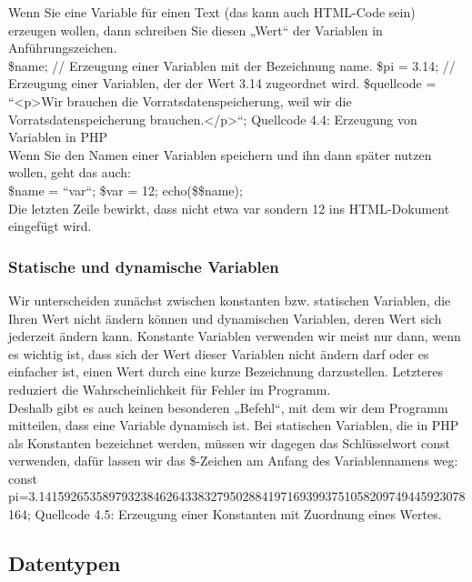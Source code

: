 Wenn Sie eine Variable für einen Text (das kann auch HTML-Code sein) erzeugen wollen, dann schreiben Sie diesen „Wert“ der Variablen in Anführungszeichen.\\

\$name;                         // Erzeugung einer Variablen mit der Bezeichnung name.
\$pi = 3.14;                    // Erzeugung einer Variablen, der der Wert 3.14 zugeordnet wird.
\$quellcode = ``<p>Wir brauchen die Vorratsdatenspeicherung, weil wir die Vorratsdatenspeicherung brauchen.</p>``;
Quellcode 4.4: Erzeugung von Variablen in PHP\\

Wenn Sie den Namen einer Variablen speichern und ihn dann später nutzen wollen, geht das auch:\\

\$name = ``var``;
\$var = 12;
echo(\$\$name); \\


Die letzten Zeile bewirkt, dass nicht etwa var sondern 12 ins HTML-Dokument eingefügt wird.

\subsubsection{Statische und dynamische Variablen}

Wir unterscheiden zunächst zwischen konstanten bzw. statischen Variablen, die Ihren Wert nicht ändern können und dynamischen Variablen, deren Wert sich jederzeit ändern kann. Konstante Variablen verwenden wir meist nur dann, wenn es wichtig ist, dass sich der Wert dieser Variablen nicht ändern darf oder es einfacher ist, einen Wert durch eine kurze Bezeichnung darzustellen. Letzteres reduziert die Wahrscheinlichkeit für Fehler im Programm.\\

Deshalb gibt es auch keinen besonderen „Befehl“, mit dem wir dem Programm mitteilen, dass eine Variable dynamisch ist. Bei statischen Variablen, die in PHP als Konstanten bezeichnet werden, müssen wir dagegen das Schlüsselwort const verwenden, dafür lassen wir das \$-Zeichen am Anfang des Variablennamens weg:\\

const pi=3.1415926535897932384626433832795028841971693993751058209749445923078164;
Quellcode 4.5: Erzeugung einer Konstanten mit Zuordnung eines Wertes.

\subsection{Datentypen}

